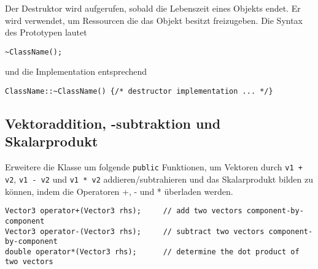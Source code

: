 Der Destruktor wird aufgerufen, sobald die Lebenszeit eines Objekts endet. Er wird verwendet, um Ressourcen die das Objekt besitzt freizugeben.
Die Syntax des Prototypen lautet

\begin{lstlisting}
~ClassName();
\end{lstlisting}

und die Implementation entsprechend

\begin{lstlisting}
ClassName::~ClassName() {/* destructor implementation ... */}
\end{lstlisting}


\subsection{Vektoraddition, -subtraktion und Skalarprodukt}
Erweitere die Klasse um folgende \texttt{public} Funktionen, um Vektoren durch \texttt{v1 + v2}, \texttt{v1 - v2} und \texttt{v1 * v2} addieren/subtrahieren und das Skalarprodukt bilden zu können, indem die Operatoren +, - und * überladen werden.

\begin{lstlisting}
Vector3 operator+(Vector3 rhs);		// add two vectors component-by-component
Vector3 operator-(Vector3 rhs);		// subtract two vectors component-by-component
double operator*(Vector3 rhs);		// determine the dot product of two vectors
\end{lstlisting}


